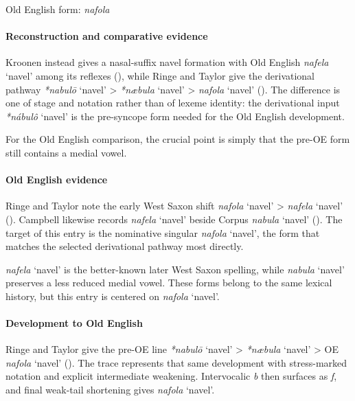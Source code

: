 \documentclass[
  british,
  a4paper,
]{article}
\providecommand{\Recon}[1]{\emph{*#1}}
\begin{document}
Old English form: \emph{nafola}

\paragraph{Reconstruction and comparative
evidence}\label{reconstruction-and-comparative-evidence-105}

Kroonen instead gives a nasal-suffix navel formation with Old English
{\emph{nafela}} `navel' among its reflexes
(), while Ringe and Taylor
give the derivational pathway \Recon{nabulō} `navel' \textgreater{}
\Recon{næbula} `navel' \textgreater{} \emph{nafola} `navel'
(). The
difference is one of stage and notation rather than of lexeme identity:
the derivational input \Recon{nábulô} `navel' is the pre-syncope form
needed for the Old English development.

For the Old English comparison, the crucial point is simply that the
pre-OE form still contains a medial vowel.

\paragraph{Old English evidence}\label{old-english-evidence-107}

Ringe and Taylor note the early West Saxon shift {\emph{nafola}} `navel'
\textgreater{} {\emph{nafela}} `navel'
(). Campbell
likewise records \emph{nafela} `navel' beside Corpus {\emph{nabula}}
`navel' (). The
target of this entry is the nominative singular {\emph{nafola}} `navel',
the form that matches the selected derivational pathway most directly.

{\emph{nafela}} `navel' is the better-known later West Saxon spelling,
while {\emph{nabula}} `navel' preserves a less reduced medial vowel.
These forms belong to the same lexical history, but this entry is
centered on {\emph{nafola}} `navel'.

\paragraph{Development to Old
English}\label{development-to-old-english-105}

Ringe and Taylor give the pre-OE line \Recon{nabulō} `navel'
\textgreater{} \Recon{næbula} `navel' \textgreater{} OE \emph{nafola}
`navel' ().
The trace represents that same development with stress-marked notation
and explicit intermediate weakening. Intervocalic \emph{b} then surfaces
as \emph{f}, and final weak-tail shortening gives \emph{nafola} `navel'.
\end{document}

